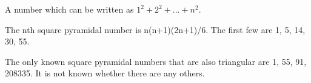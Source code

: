  A number which can be written as $1^{2}+2^{2}+...+n^{2}.$ 
\par
The nth square pyramidal number is n(n+1)(2n+1)/6.
The first few are 1, 5, 14, 30, 55.
\par
The only known square pyramidal numbers that are also 
triangular are 1, 55, 91, 208335. It is not known whether there 
are any others.
